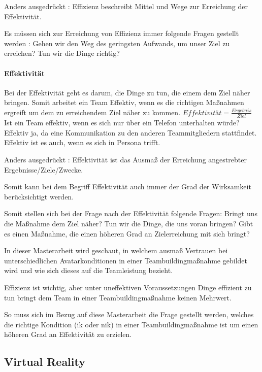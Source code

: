 \documentclass[a4paper,11pt]{article}%
\renewcommand{\\}{\vspace*{0.5\baselineskip} \newline}
\begin{document}
Anders ausgedrückt : Effizienz beschreibt Mittel und Wege zur Erreichung der Effektivität.

Es müssen sich zur Erreichung von Effizienz immer folgende Fragen gestellt werden :
Gehen wir den Weg des geringsten Aufwands, um unser Ziel zu erreichen?
Tun wir die Dinge richtig?

\paragraph{Effektivität}
Bei der Effektivität geht es darum, die Dinge zu tun, die einem dem Ziel näher bringen. 
Somit arbeitet ein Team Effektiv, wenn es die richtigen Maßnahmen ergreift um dem zu erreichendem Ziel näher zu kommen.\\
$Effektivität = \frac{Ergebnis}{Ziel}$ \\
Ist ein Team effektiv, wenn es sich nur über ein Telefon unterhalten würde?
Effektiv ja, da eine Kommunikation zu den anderen Teammitgliedern stattfindet.
Effektiv ist es auch, wenn es sich in Persona trifft.

Anders ausgedrückt : Effektivität ist das Ausmaß der Erreichung angestrebter Ergebnisse/Ziele/Zwecke.

Somit kann bei dem Begriff \dq{}Effektivität\dq{} auch immer der Grad der Wirksamkeit berücksichtigt werden.

Somit stellen sich bei der Frage nach der Effektivität folgende Fragen: 
Bringt uns die Maßnahme dem Ziel näher? 
Tun wir die Dinge, die uns voran bringen?
Gibt es einen Maßnahme, die einen höheren Grad an Zielerreichung mit sich bringt?

In dieser Masterarbeit wird geschaut, in welchem ausmaß Vertrauen bei unterschiedlichen Avatarkonditionen in einer Teambuildingmaßnahme gebildet wird und wie sich dieses auf die Teamleistung bezieht.

Effizienz ist wichtig, aber unter uneffektiven Voraussetzungen Dinge effizient zu tun bringt dem Team in einer Teambuildingmaßnahme keinen Mehrwert.

So muss sich im Bezug auf diese Masterarbeit die Frage gestellt werden, welches die richtige Kondition (\ac{ik} oder \ac{nik}) in einer Teambuildingmaßnahme ist um einen höheren Grad an Effektivität zu erzielen.
	\subsection{Virtual Reality}
	\label{Virtual Reality}
\end{document}
